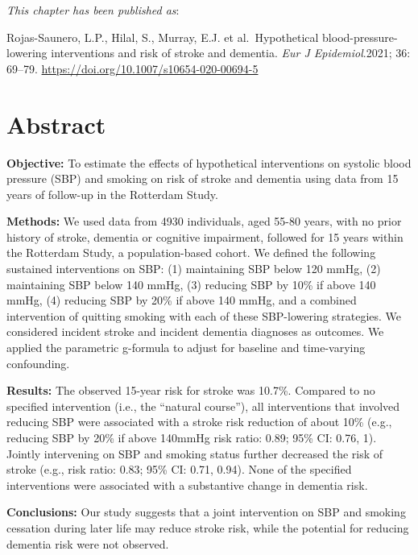 \documentclass[
]{book}
\begin{document}
\small

\noindent
\emph{This chapter has been published as}:

Rojas-Saunero, L.P., Hilal, S., Murray, E.J. et al.~Hypothetical blood-pressure-lowering interventions and risk of stroke and dementia. \emph{Eur J Epidemiol}.2021; 36: 69--79. \url{https://doi.org/10.1007/s10654-020-00694-5}
\newpage
\normalsize


\newpage

\hypertarget{abstract-1}{%
\section{Abstract}\label{abstract-1}}

\textbf{Objective:} To estimate the effects of hypothetical interventions on systolic blood pressure (SBP) and smoking on risk of stroke and dementia using data from 15 years of follow-up in the Rotterdam Study.

\textbf{Methods:} We used data from 4930 individuals, aged 55-80 years, with no prior history of stroke, dementia or cognitive impairment, followed for 15 years within the Rotterdam Study, a population-based cohort. We defined the following sustained interventions on SBP: (1) maintaining SBP below 120 mmHg, (2) maintaining SBP below 140 mmHg, (3) reducing SBP by 10\% if above 140 mmHg, (4) reducing SBP by 20\% if above 140 mmHg, and a combined intervention of quitting smoking with each of these SBP-lowering strategies. We considered incident stroke and incident dementia diagnoses as outcomes. We applied the parametric g-formula to adjust for baseline and time-varying confounding.

\textbf{Results:} The observed 15-year risk for stroke was 10.7\%. Compared to no specified intervention (i.e., the ``natural course''), all interventions that involved reducing SBP were associated with a stroke risk reduction of about 10\% (e.g., reducing SBP by 20\% if above 140mmHg risk ratio: 0.89; 95\% CI: 0.76, 1). Jointly intervening on SBP and smoking status further decreased the risk of stroke (e.g., risk ratio: 0.83; 95\% CI: 0.71, 0.94). None of the specified interventions were associated with a substantive change in dementia risk.

\textbf{Conclusions:} Our study suggests that a joint intervention on SBP and smoking cessation during later life may reduce stroke risk, while the potential for reducing dementia risk were not observed.
\end{document}
